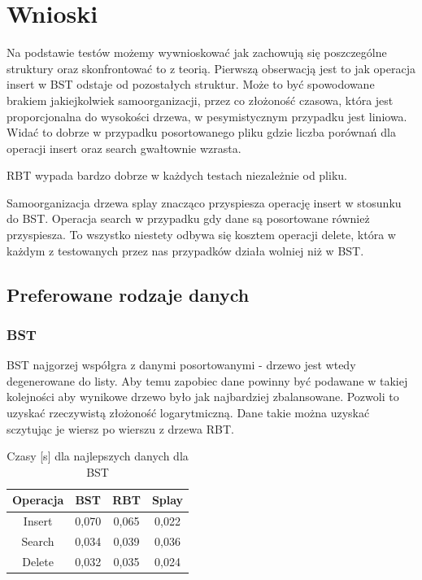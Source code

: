 \documentclass[10pt,a4paper]{article}
\theoremstyle{definition}
\theoremstyle{definition}
\theoremstyle{definition}
\begin{document}
\section{Wnioski}
    Na podstawie testów możemy wywnioskować jak zachowują się poszczególne struktury oraz skonfrontować to z teorią. Pierwszą obserwacją jest to jak operacja insert w BST odstaje od pozostałych struktur. Może to być spowodowane brakiem jakiejkolwiek samoorganizacji, przez co złożoność czasowa, która jest proporcjonalna do wysokości drzewa, w pesymistycznym przypadku jest liniowa. Widać to dobrze w przypadku posortowanego pliku gdzie liczba porównań dla operacji insert oraz search gwałtownie wzrasta.
    
    RBT wypada bardzo dobrze w każdych testach niezależnie od pliku.
    
    Samoorganizacja drzewa splay znacząco przyspiesza operację insert w stosunku do BST. Operacja search w przypadku gdy dane są posortowane również przyspiesza. To wszystko niestety odbywa się kosztem operacji delete, która w każdym z testowanych przez nas przypadków działa wolniej niż w BST.
    
    
    \subsection{Preferowane rodzaje danych}
        \subsubsection{BST}
            BST najgorzej współgra z danymi posortowanymi - drzewo jest wtedy degenerowane do listy. Aby temu zapobiec dane powinny być podawane w takiej kolejności aby wynikowe drzewo było jak najbardziej zbalansowane. Pozwoli to uzyskać rzeczywistą złożoność logarytmiczną. Dane takie można uzyskać sczytując je wiersz po wierszu z drzewa RBT.
            
            \begin{table}[h]
            \centering
            \caption{Czasy [s] dla najlepszych danych dla BST}
            \label{tab:pbst}
            \begin{tabular}{|c|c|c|c|} \hline
            		Operacja & BST & RBT & Splay \\
            		\hline
            		Insert & 0,070 & 0,065 & 0,022 \\
            		\hline
            		Search & 0,034 & 0,039 & 0,036 \\
            	    \hline
            		Delete & 0,032 & 0,035 & 0,024 \\
            		\hline
            	
            \end{tabular}
            \end{table}
            
\end{document}
